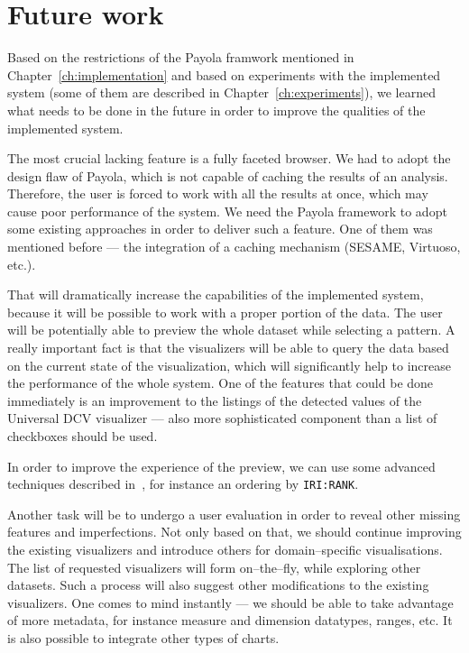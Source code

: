 \chapter{Future work}
\label{ch:future}

Based on the restrictions of the Payola framwork mentioned in Chapter~\ref{ch:implementation}
and based on experiments with the implemented system (some of them are described in
Chapter~\ref{ch:experiments}), we learned what needs to be done in the future in order to improve
the qualities of the implemented system.

The most crucial lacking feature is a fully faceted browser. We had to adopt the 
design flaw of Payola, which is not capable of caching the results of an analysis. 
Therefore, the user is forced to work with all the results at once, which may 
cause poor performance of the system. We need the Payola framework to adopt some 
existing approaches in order to deliver such a feature. One of them was 
mentioned before --- the integration of a caching mechanism (SESAME, Virtuoso, etc.).

That will dramatically increase the capabilities of the implemented system, 
because it will be possible to work with a proper portion of the data. The user will 
be potentially able to preview the whole dataset while selecting a pattern. A 
really important fact is that the visualizers will be able to query the data 
based on the current state of the visualization, which will significantly help 
to increase the performance of the whole system. One of the features that could 
be done immediately is an improvement to the listings of the detected values of the 
Universal DCV visualizer --- also more sophisticated component than a list of 
checkboxes should be used.

In order to improve the experience of the preview, we can use some advanced 
techniques described in~\cite{faceted-ldow2009}, for instance an ordering by 
\texttt{IRI:RANK}.

Another task will be to undergo a user evaluation in order to reveal other 
missing features and imperfections. Not only based on that, we should continue 
improving the existing visualizers and introduce others for
domain--specific visualisations. The list of requested visualizers will form 
on--the--fly, while exploring other datasets. Such a process will also suggest 
other modifications to the existing visualizers. One comes to mind instantly --- we 
should be able to take advantage of more metadata, for instance measure and 
dimension datatypes, ranges, etc. It is also possible to integrate other types 
of charts.

